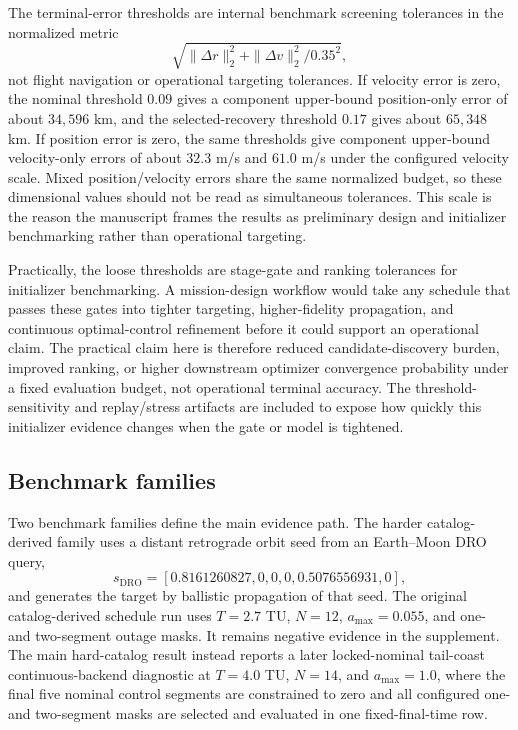 \documentclass[preprint,12pt]{elsarticle}
\begin{document}
The terminal-error thresholds are internal benchmark screening tolerances in the normalized metric
\begin{equation}
\sqrt{\|\Delta r\|_2^2+\|\Delta v\|_2^2/0.35^2},
\end{equation}
not flight navigation or operational targeting tolerances. If velocity error is zero, the nominal threshold $0.09$ gives a component upper-bound position-only error of about $34{,}596$ km, and the selected-recovery threshold $0.17$ gives about $65{,}348$ km. If position error is zero, the same thresholds give component upper-bound velocity-only errors of about $32.3$ m/s and $61.0$ m/s under the configured velocity scale. Mixed position/velocity errors share the same normalized budget, so these dimensional values should not be read as simultaneous tolerances. This scale is the reason the manuscript frames the results as preliminary design and initializer benchmarking rather than operational targeting.

Practically, the loose thresholds are stage-gate and ranking tolerances for initializer benchmarking. A mission-design workflow would take any schedule that passes these gates into tighter targeting, higher-fidelity propagation, and continuous optimal-control refinement before it could support an operational claim. The practical claim here is therefore reduced candidate-discovery burden, improved ranking, or higher downstream optimizer convergence probability under a fixed evaluation budget, not operational terminal accuracy. The threshold-sensitivity and replay/stress artifacts are included to expose how quickly this initializer evidence changes when the gate or model is tightened.

\subsection{Benchmark families}

Two benchmark families define the main evidence path. The harder catalog-derived family uses a distant retrograde orbit seed from an Earth--Moon DRO query,
\begin{equation}
s_{\mathrm{DRO}}=[0.8161260827,0,0,0,0.5076556931,0],
\end{equation}
and generates the target by ballistic propagation of that seed. The original catalog-derived schedule run uses $T=2.7$ TU, $N=12$, $a_{\max}=0.055$, and one- and two-segment outage masks. It remains negative evidence in the supplement. The main hard-catalog result instead reports a later locked-nominal tail-coast continuous-backend diagnostic at $T=4.0$ TU, $N=14$, and $a_{\max}=1.0$, where the final five nominal control segments are constrained to zero and all configured one- and two-segment masks are selected and evaluated in one fixed-final-time row.
\end{document}
